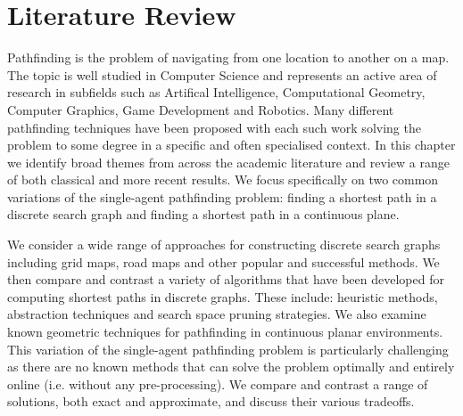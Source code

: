 \chapter{Literature Review}
\label{cha::lit}
Pathfinding is the problem of navigating from one location to another on a
map. The topic is well studied in Computer Science and represents an active
area of research in subfields such as Artifical Intelligence, Computational
Geometry, Computer Graphics, Game Development and Robotics.  Many different
pathfinding techniques have been proposed with each such work solving the
problem to some degree in a specific and often specialised context.  In this
chapter we identify broad themes from across the academic literature and
review a range of both classical and more recent results.  We focus
specifically on two common variations of the single-agent pathfinding problem:
finding a shortest path in a discrete search graph and finding a shortest path
in a continuous plane.

We consider a wide range of approaches for constructing discrete search graphs
including grid maps, road maps and other popular and successful methods.  We
then compare and contrast a variety of algorithms that have been developed for
computing shortest paths in discrete graphs. These include: heuristic methods,
abstraction techniques and search space pruning strategies.  We also examine
known geometric techniques for pathfinding in continuous planar environments.
This variation of the single-agent pathfinding problem is particularly
challenging as there are no known methods that can solve the problem optimally
and entirely online (i.e. without any pre-processing).  We compare and
contrast a range of solutions, both exact and approximate, and discuss their
various tradeoffs.


